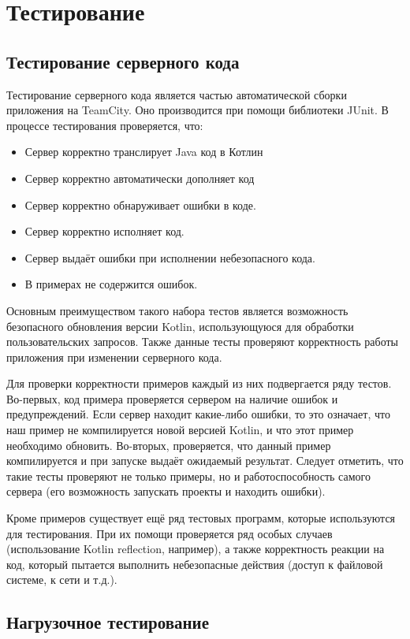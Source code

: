 \chapter{Тестирование}
\section{Тестирование серверного кода}
	Тестирование серверного кода является частью автоматической сборки приложения на TeamCity. Оно производится при помощи библиотеки JUnit. В процессе тестирования проверяется, что:
\begin{itemize}
\item Сервер корректно транслирует Java код в Котлин
\item Сервер корректно автоматически дополняет код
\item Сервер корректно обнаруживает ошибки в коде.
\item Сервер корректно исполняет код.
\item Сервер выдаёт ошибки при исполнении небезопасного кода.
\item В примерах не содержится ошибок. 
\end{itemize}
	
	Основным преимуществом такого набора тестов является возможность безопасного обновления версии Kotlin, использующуюся для обработки пользовательских запросов. Также данные тесты проверяют корректность работы приложения при изменении серверного кода.
	
	Для проверки корректности примеров каждый из них подвергается ряду тестов. Во-первых, код примера проверяется сервером на наличие ошибок и предупреждений. Если сервер находит какие-либо ошибки, то это означает, что наш пример не компилируется новой версией Kotlin, и что этот пример необходимо обновить. Во-вторых, проверяется, что данный пример компилируется и при запуске выдаёт ожидаемый результат. Следует отметить, что такие тесты проверяют не только примеры, но и работоспособность самого сервера (его возможность запускать проекты и находить ошибки). 
	
	Кроме примеров существует ещё ряд тестовых программ, которые  используются для тестирования. При их помощи проверяется ряд особых случаев (использование Kotlin reflection, например), а также корректность реакции на код, который пытается выполнить небезопасные действия (доступ к файловой системе, к сети и т.д.).
	
\section{Нагрузочное тестирование}

